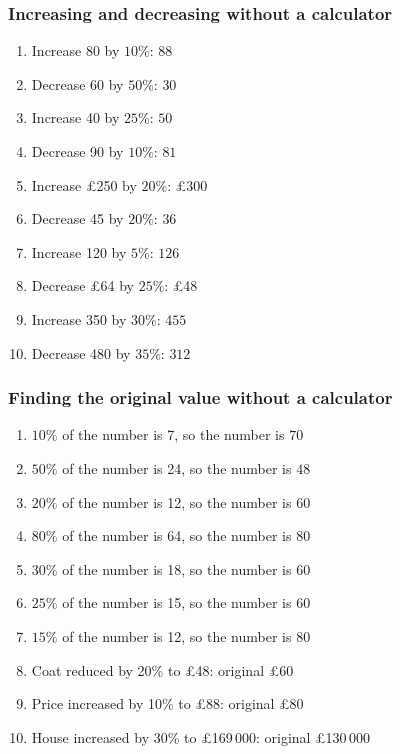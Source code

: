 \documentclass{beamer}
\begin{document}
\begin{frame}[shrink=15]
\frametitle{Increasing and decreasing without a calculator}
\footnotesize
\begin{enumerate}\setlength{\itemsep}{1pt}
\item Increase 80 by \(10\%\): \(88\)
\item Decrease 60 by \(50\%\): \(30\)
\item Increase 40 by \(25\%\): \(50\)
\item Decrease 90 by \(10\%\): \(81\)
\item Increase \pounds 250 by \(20\%\): \pounds 300
\item Decrease 45 by \(20\%\): \(36\)
\item Increase 120 by \(5\%\): \(126\)
\item Decrease \pounds 64 by \(25\%\): \pounds 48
\item Increase 350 by \(30\%\): \(455\)
\item Decrease 480 by \(35\%\): \(312\)
\end{enumerate}
\end{frame}

\begin{frame}[shrink=15]
\frametitle{Finding the original value without a calculator}
\footnotesize
\begin{enumerate}\setlength{\itemsep}{1pt}
\item \(10\%\) of the number is 7, so the number is \(70\)
\item \(50\%\) of the number is 24, so the number is \(48\)
\item \(20\%\) of the number is 12, so the number is \(60\)
\item \(80\%\) of the number is 64, so the number is \(80\)
\item \(30\%\) of the number is 18, so the number is \(60\)
\item \(25\%\) of the number is 15, so the number is \(60\)
\item \(15\%\) of the number is 12, so the number is \(80\)
\item Coat reduced by 20\% to \pounds 48: original \pounds 60
\item Price increased by 10\% to \pounds 88: original \pounds 80
\item House increased by 30\% to \pounds 169\,000: original \pounds 130\,000
\end{enumerate}
\end{frame}
\end{document}
